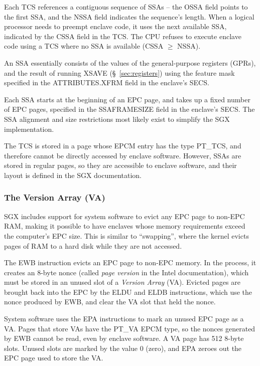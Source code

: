 Each TCS references a contiguous sequence of SSAs -- the OSSA field points to
the first SSA, and the NSSA field indicates the sequence's length. When a
logical processor needs to preempt enclave code, it uses the next available
SSA, indicated by the CSSA field in the TCS. The CPU refuses to execute enclave
code using a TCS where no SSA is available (CSSA $\ge$ NSSA).

An SSA essentially consists of the values of the general-purpose registers
(GPRs), and the result of running XSAVE (\S~\ref{sec:registers}) using the
feature mask specified in the ATTRIBUTES.XFRM field in the enclave's SECS.


Each SSA starts at the beginning of an EPC page, and takes up a fixed number of
EPC pages, specified in the SSAFRAMESIZE field in the enclave's SECS. The SSA
alignment and size restrictions most likely exist to simplify the SGX
implementation.

The TCS is stored in a page whose EPCM entry has the type PT\_TCS, and
therefore cannot be directly accessed by enclave software. However, SSAs are
stored in regular pages, so they are accessible to enclave software, and their
layout is defined in the SGX documentation.

\subsubsection{The Version Array (VA)}
\label{sec:va}

SGX includes support for system software to evict any EPC page to non-EPC RAM,
making it possible to have enclaves whose memory requirements exceed the
computer's EPC size. This is similar to ``swapping'', where the kernel evicts
pages of RAM to a hard disk while they are not accessed.


The EWB instruction evicts an EPC page to non-EPC memory. In the process, it
creates an 8-byte nonce (called \textit{page version} in the Intel
documentation), which must be stored in an unused slot of a \textit{Version
Array} (VA). Evicted pages are brought back into the EPC by the ELDU and ELDB
instructions, which use the nonce produced by EWB, and clear the VA slot that
held the nonce.

System software uses the EPA instructions to mark an unused EPC page as a VA.
Pages that store VAs have the PT\_VA EPCM type, so the nonces generated by EWB
cannot be read, even by enclave software.  A VA page has 512 8-byte slots.
Unused slots are marked by the value 0 (zero), and EPA zeroes out the EPC page
used to store the VA.

